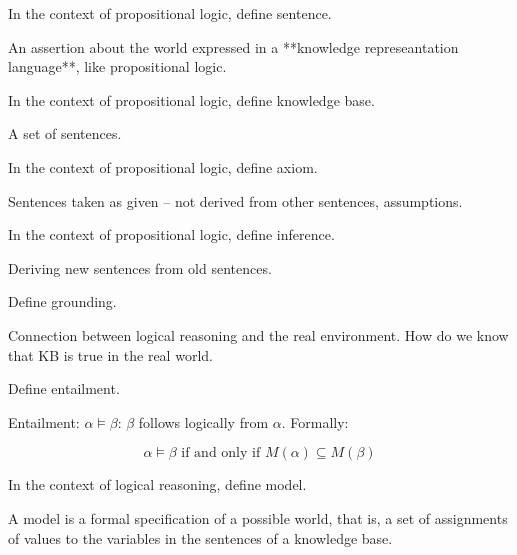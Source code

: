 \begin{questions}

\question In the context of propositional logic, define sentence.

\begin{solution}[.75in]
An assertion about the world expressed in a **knowledge represeantation language**, like propositional logic.
\end{solution}

\question In the context of propositional logic, define knowledge base.

\begin{solution}[.75in]
A set of sentences.
\end{solution}

\question In the context of propositional logic, define axiom.

\begin{solution}[.75in]
Sentences taken as given -- not derived from other sentences, assumptions.
\end{solution}

\question In the context of propositional logic, define inference.

\begin{solution}[.75in]
Deriving new sentences from old sentences.
\end{solution}

\question Define grounding.

\begin{solution}[.75in]
Connection between logical reasoning and the real environment.  How do we know that KB is true in the real world.
\end{solution}

\question Define entailment.

\begin{solution}[1in]
Entailment: $\alpha \models \beta$: $\beta$ follows logically from $\alpha$.  Formally:

$$
\alpha \models \beta \text{ if and only if } M(\alpha) \subseteq M(\beta)
$$

\end{solution}

\newpage

\question In the context of logical reasoning, define model.

\begin{solution}[.75in]
A model is a formal specification of a possible world, that is, a set of assignments of values to the variables in the sentences of a knowledge base.
\end{solution}



\end{questions}
